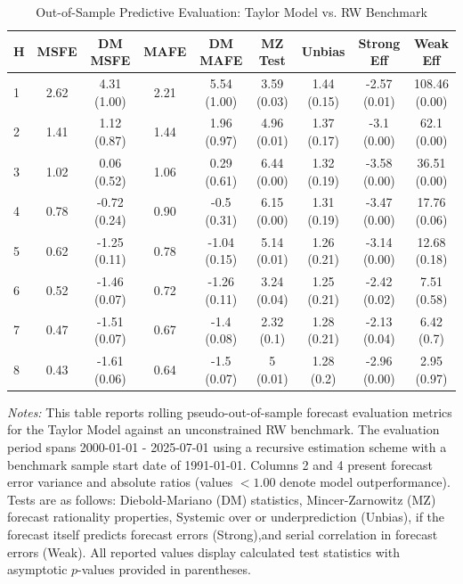 \begin{table}[htbp]
\centering
\caption{Out-of-Sample Predictive Evaluation: Taylor Model vs. RW Benchmark}
\label{tab:taylor_model_evaluation}
\footnotesize
\begin{tabular}{l cccccccc}
\hline\hline
\rule{0pt}{3ex}
\textbf{H} & \textbf{MSFE} & \textbf{DM MSFE} & \textbf{MAFE} & \textbf{DM MAFE} & \textbf{MZ Test} & \textbf{Unbias} & \textbf{Strong Eff} & \textbf{Weak Eff} \\[0.5ex]
\hline
\rule{0pt}{2.5ex}
1 & 2.62 & 4.31 (1.00) & 2.21 & 5.54 (1.00) & 3.59 (0.03) & 1.44 (0.15) & -2.57 (0.01) & 108.46 (0.00) \\
2 & 1.41 & 1.12 (0.87) & 1.44 & 1.96 (0.97) & 4.96 (0.01) & 1.37 (0.17) & -3.1 (0.00) & 62.1 (0.00) \\
3 & 1.02 & 0.06 (0.52) & 1.06 & 0.29 (0.61) & 6.44 (0.00) & 1.32 (0.19) & -3.58 (0.00) & 36.51 (0.00) \\
4 & 0.78 & -0.72 (0.24) & 0.90 & -0.5 (0.31) & 6.15 (0.00) & 1.31 (0.19) & -3.47 (0.00) & 17.76 (0.06) \\
5 & 0.62 & -1.25 (0.11) & 0.78 & -1.04 (0.15) & 5.14 (0.01) & 1.26 (0.21) & -3.14 (0.00) & 12.68 (0.18) \\
6 & 0.52 & -1.46 (0.07) & 0.72 & -1.26 (0.11) & 3.24 (0.04) & 1.25 (0.21) & -2.42 (0.02) & 7.51 (0.58) \\
7 & 0.47 & -1.51 (0.07) & 0.67 & -1.4 (0.08) & 2.32 (0.1) & 1.28 (0.21) & -2.13 (0.04) & 6.42 (0.7) \\
8 & 0.43 & -1.61 (0.06) & 0.64 & -1.5 (0.07) & 5 (0.01) & 1.28 (0.2) & -2.96 (0.00) & 2.95 (0.97) \\
\hline\hline
\end{tabular}%
\par\smallskip
\parbox{\textwidth}{\scriptsize \textit{Notes:} This table reports rolling pseudo-out-of-sample forecast evaluation metrics for the Taylor Model against an unconstrained RW benchmark. The evaluation period spans 2000-01-01 - 2025-07-01 using a recursive estimation scheme with a benchmark sample start date of 1991-01-01. Columns 2 and 4 present forecast error variance and absolute ratios (values $< 1.00$ denote model outperformance). Tests are as follows: Diebold-Mariano (DM) statistics, Mincer-Zarnowitz (MZ) forecast rationality properties, Systemic over or underprediction (Unbias), if the forecast itself predicts forecast errors (Strong),and serial correlation in forecast errors (Weak). All reported values display calculated test statistics with asymptotic $p$-values provided in parentheses.}
\end{table}
